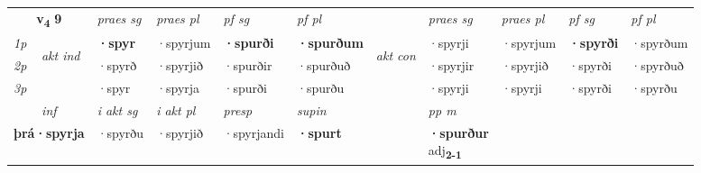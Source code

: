 \noindent
\begin{tabular}{lllllllllll} \toprule
\multicolumn{2}{c}{\textbf{v{\textsubscript{4}}} \Large{\textbf{9}}}  &  \textit{praes sg}  & \textit{praes pl}  &\textit{ pf sg} & \textit{pf pl} &  &  \textit{praes sg}  & \textit{praes pl}  & \textit{pf sg} & \textit{pf pl } \\*
	\cmidrule{3-6} \cmidrule{8-11}
 {\textit{1p}} & \multirow{3}{*}{\begin{turn}{90}\textit{akt ind}\end{turn}} & \textbf{·spyr} & ·spyrjum & \textbf{·spurði} & \textbf{·spurðum} & \multirow{3}{*}{\begin{turn}{90}\textit{akt con}\end{turn}} &·spyrji & ·spyrjum & \textbf{·spyrði} & ·spyrðum\\*
 {\textit{2p}} &  &  ·spyrð  & ·spyrjið & ·spurðir & ·spurðuð & & ·spyrjir & ·spyrjið & ·spyrði & ·spyrðuð \\*
{\textit{3p}} &  & ·spyr & ·spyrja & ·spurði & ·spurðu & & ·spyrji & ·spyrji& ·spyrði & ·spyrðu \\*
\cmidrule{3-6} \cmidrule{8-11}

   \multicolumn{2}{c}{\textit{inf}}  & \textit{i akt sg} & \textit{i akt pl}   & \textit{presp} & \textit{supin}  && \textit{pp m} \\*
  \multicolumn{2}{c}{\textbf{þrá\allowbreak ·spyrja}} & ·spyrðu  & ·spyrjið   & ·spyrjandi &  \textbf{·spurt}  && \specialcell{\textbf{·spurður} \\ adj\textbf{\textsubscript{2-1}}} \\*
\end{tabular}

